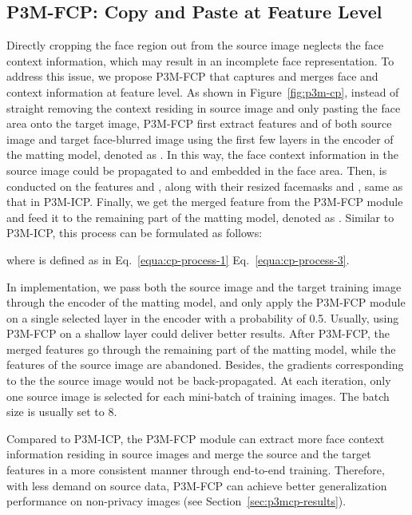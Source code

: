 \documentclass[twocolumn]{svjour3}
\begin{document}
\subsection{P3M-FCP: Copy and Paste at Feature Level}
Directly cropping the face region out from the source image neglects the face context information, which may result in an incomplete face representation. To address this issue, we propose P3M-FCP that captures and merges face and context information at feature level. As shown in Figure~\ref{fig:p3m-cp}, instead of straight removing the context residing in source image and only pasting the face area onto the target image, P3M-FCP first extract features  and  of both source image  and target face-blurred image  using the first few layers in the encoder of the matting model, denoted as . In this way, the face context information in the source image could be propagated to and embedded in the face area. Then,  is conducted on the features  and , along with their resized facemasks  and , same as that in P3M-ICP. Finally, we get the merged feature  from the P3M-FCP module and feed it to the remaining part of the matting model, denoted as . Similar to P3M-ICP, this process can be formulated as follows:


where  is defined as in Eq.~\ref{equa:cp-process-1}  Eq.~\ref{equa:cp-process-3}.

In implementation, we pass both the source image  and the target training image  through the encoder of the matting model, and only apply the P3M-FCP module on a single selected layer in the encoder with a probability of 0.5. 
Usually, using P3M-FCP on a shallow layer could deliver better results. After P3M-FCP, the merged features go through the remaining part of the matting model, while the features of the source image are abandoned. Besides, the gradients corresponding to the the source image would not be back-propagated. At each iteration, only one source image is selected for each mini-batch of training images. The batch size is usually set to 8.

Compared to P3M-ICP, the P3M-FCP module can extract more face context information residing in source images and merge the source and the target features in a more consistent manner through end-to-end training. Therefore, with less demand on source data, P3M-FCP can achieve better generalization performance on non-privacy images (see Section~\ref{sec:p3mcp-results}).
\end{document}
